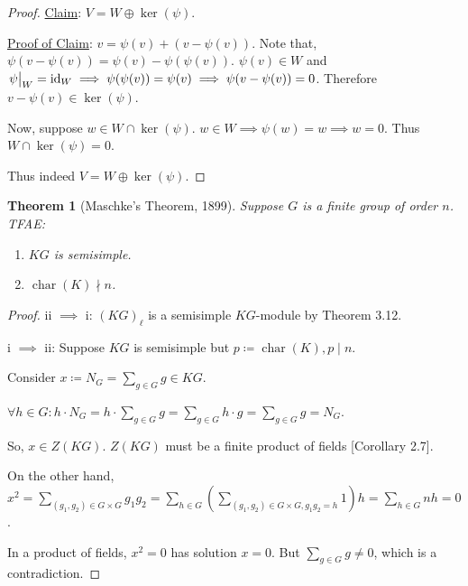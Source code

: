 \documentclass{article}
\theoremstyle{definition}
\theoremstyle{plain}
\newtheorem{theorem}{Theorem}[section]
\theoremstyle{remark}
\begin{document}
\begin{proof}
        \underline{Claim}: \(V = W \oplus \ker(\psi)\).

        \underline{Proof of Claim}: \(v = \psi(v) + (v - \psi(v))\). Note that, \(\psi(v-\psi(v)) = \psi(v) - \psi(\psi(v))\). \(\psi(v) \in W\) and \(\eval{\psi}_{W} = \operatorname{id}_{W} \implies \psi(\psi(v)) = \psi(v) \implies \psi(v-\psi(v)) = 0\). Therefore \(v - \psi(v) \in \ker(\psi)\).

        Now, suppose \(w\in W\cap \ker(\psi)\). \(w\in W \implies \psi(w) = w \implies w = 0\). Thus \(W \cap \ker(\psi) = 0\).

        Thus indeed \(V = W \oplus \ker(\psi)\).

    \end{proof}

    \begin{theorem}
        [Maschke's Theorem, 1899]

        Suppose \(G\) is a finite group of order \(n\). TFAE:

        \begin{enumerate}[label=\roman*)]
            \item \(KG\) is semisimple.
            \item \(\operatorname{char}(K) \nmid n\). 
        \end{enumerate} 
    \end{theorem}

    \begin{proof}
        ii \(\implies\) i: \((KG)_\ell\) is a semisimple \(KG\)-module by Theorem 3.12.

        i \(\implies\) ii: Suppose \(KG\) is semisimple but \(p \coloneqq \operatorname{char}(K), p\mid n\).
        
        Consider \(x \coloneqq N_G = \sum_{g\in G} g \in KG\).

        \(\forall h\in G: h \cdot N_G = h \cdot \sum_{g\in G} g = \sum_{g\in G} h \cdot g = \sum_{g\in G} g = N_G\).

        So, \(x\in Z(KG)\). \(Z(KG)\) must be a finite product of fields [Corollary 2.7].

        On the other hand, \(x^2 = \sum_{(g_1 , g_2) \in G \times G} g_1 g_2 = \sum_{h\in G} \left( \sum_{(g_1, g_2) \in G \times G , g_1 g_2 = h} 1 \right) h = \sum_{h\in G} n h = 0\). 

        In a product of fields, \(x^2 = 0\) has solution \(x = 0\). But \(\sum_{g\in G} g \neq 0\), which is a contradiction.
    \end{proof}
\end{document}
